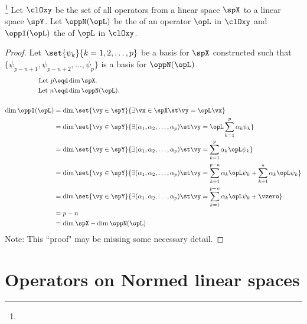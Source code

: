 \begin{theorem}
\footnote{
  }
Let $\clOxy$ be the set of all operators from a linear space $\spX$ to a linear space $\spY$.
Let $\oppN(\opL)$ be the  of an operator $\opL$ in $\clOxy$
and $\oppI(\opL)$ the  of $\opL$ in $\clOxy$.
\thmbox{
  \dim \oppI(\opL) + \dim\oppN(\opL) = \dim \spX
  \qquad\scriptstyle
  \forall \opL\in\clOxy
  }
\end{theorem}
\begin{proof}
Let $\set{\psi_k}{k=1,2,\ldots,p}$ be a basis for $\spX$
constructed such that $\{\psi_{p-n+1},\psi_{p-n+2},\ldots,\psi_p\}$
is a basis for $\oppN(\opL)$.
\begin{align*}
  \text{Let } p &\eqd \dim\spX.         \\
  \text{Let } n &\eqd \dim\oppN(\opL).  \\
  \\
  \dim\oppI(\opL)
    &= \dim \set{\vy\in\spY}{\exists\vx\in\spX \st \vy=\opL\vx}
  \\&= \dim \set{\vy\in\spY}{\exists(\alpha_1,\alpha_2,\ldots,\alpha_p) \st \vy=\opL\sum_{k=1}^p\alpha_k\psi_k}
  \\&= \dim \set{\vy\in\spY}{\exists(\alpha_1,\alpha_2,\ldots,\alpha_p) \st
            \vy=\sum_{k=1}^p\alpha_k\opL\psi_k}
  \\&= \dim \set{\vy\in\spY}{\exists(\alpha_1,\alpha_2,\ldots,\alpha_p) \st
            \vy=\sum_{k=1}^{p-n}\alpha_k\opL\psi_k+\sum_{k=1}^n\alpha_k\opL\psi_k}
  \\&= \dim \set{\vy\in\spY}{\exists(\alpha_1,\alpha_2,\ldots,\alpha_p) \st
            \vy=\sum_{k=1}^{p-n}\alpha_k\opL\psi_k+\vzero}
  \\&= p-n
  \\&= \dim\spX - \dim\oppN(\opL)
\end{align*}
Note: This ``proof" may be missing some necessary detail. \problem
\end{proof}

\section{Operators on Normed linear spaces}

